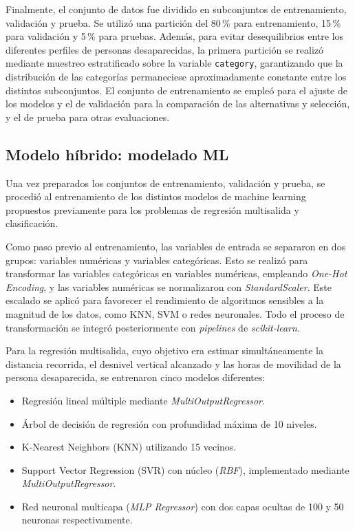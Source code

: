 Finalmente, el conjunto de datos fue dividido en subconjuntos de entrenamiento, validación y prueba. Se utilizó una partición del 80\,\% para entrenamiento, 15\,\% para validación y 5\,\% para pruebas. Además, para evitar desequilibrios entre los diferentes perfiles de personas desaparecidas, la primera partición se realizó mediante muestreo estratificado sobre la variable \texttt{category}, garantizando que la distribución de las categorías permaneciese aproximadamente constante entre los distintos subconjuntos. El conjunto de entrenamiento se empleó para el ajuste de los modelos y el de validación para la comparación de las alternativas y selección, y el de prueba para otras evaluaciones.


\subsection{Modelo híbrido: modelado ML}

Una vez preparados los conjuntos de entrenamiento, validación y prueba, se procedió al entrenamiento de los distintos modelos de machine learning propuestos previamente para los problemas de regresión multisalida y clasificación.

Como paso previo al entrenamiento, las variables de entrada se separaron en dos grupos: variables numéricas y variables categóricas. Esto se realizó para transformar las variables categóricas en variables numéricas, empleando \textit{One-Hot Encoding}, y las variables numéricas se normalizaron con \textit{StandardScaler}. Este escalado se aplicó para favorecer el rendimiento de algoritmos sensibles a la magnitud de los datos, como KNN, SVM o redes neuronales. Todo el proceso de transformación se integró posteriormente con \textit{pipelines} de \textit{scikit-learn}.

Para la regresión multisalida, cuyo objetivo era estimar simultáneamente la distancia recorrida, el desnivel vertical alcanzado y las horas de movilidad de la persona desaparecida, se entrenaron cinco modelos diferentes:
\begin{itemize}
    \item Regresión lineal múltiple mediante \textit{MultiOutputRegressor}.
    \item Árbol de decisión de regresión con profundidad máxima de 10 niveles.
    \item K-Nearest Neighbors (KNN) utilizando 15 vecinos.
    \item Support Vector Regression (SVR) con núcleo (\textit{RBF}), implementado mediante \textit{MultiOutputRegressor}.
    \item Red neuronal multicapa (\textit{MLP Regressor}) con dos capas ocultas de 100 y 50 neuronas respectivamente.
\end{itemize}

